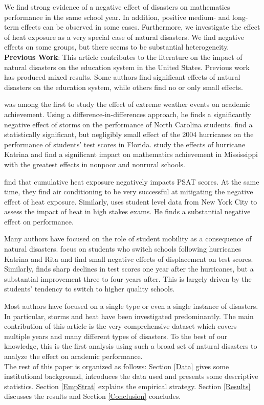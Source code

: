 We find strong evidence of a negative effect of disasters on mathematics performance in the same school year. In addition, positive medium- and long-term effects can be observed in some cases. Furthermore, we investigate the effect of heat exposure as a very special case of natural disasters. We find negative effects on some groups, but there seems to be substantial heterogeneity.
\\

\textbf{Previous Work}: This article contributes to the literature on the impact of natural disasters on the education system in the United States. Previous work has produced mixed results. Some authors find significant effects of natural disasters on the education system, while others find no or only small effects.

\cite{Holmes_2002} was among the first to study the effect of extreme weather events on academic achievement. Using a difference-in-differences approach, he finds a significantly negative effect of storms on the performance of North Carolina students. \cite{Baggerly_2008} find a statistically significant, but negligibly small effect of the 2004 hurricanes on the performance of students' test scores in Florida. \cite{Lamb_2013} study the effects of hurricane Katrina and find a significant impact on mathematics achievement in Mississippi with the greatest effects in nonpoor and nonrural schools.

\cite{Goodman_2020} find that cumulative heat exposure negatively impacts PSAT scores. At the same time, they find air conditioning to be very successful at mitigating the negative effect of heat exposure. Similarly, \cite{Park_2022} uses student level data from New York City to assess the impact of heat in high stakes exams. He finds a substantial negative effect on performance.

Many authors have focused on the role of student mobility as a consequence of natural disasters. \cite{Pane_2008} focus on students who switch schools following hurricanes Katrina and Rita and find small negative effects of displacement on test scores. Similarly, \cite{Sacerdote_2012} finds sharp declines in test scores one year after the hurricanes, but a substantial improvement three to four years after. This is largely driven by the students' tendency to switch to higher quality schools.

Most authors have focused on a single type or even a single instance of disasters. In particular, storms and heat have been investigated predominantly. The main contribution of this article is the very comprehensive dataset which covers multiple years and many different types of disasters. To the best of our knowledge, this is the first analysis using such a broad set of natural disasters to analyze the effect on academic performance.
\\

The rest of this paper is organized as follows: Section \ref{Data} gives some institutional background, introduces the data used and presents some descriptive statistics. Section \ref{EmpStrat} explains the empirical strategy. Section \ref{Results} discusses the results and Section \ref{Conclusion} concludes.

